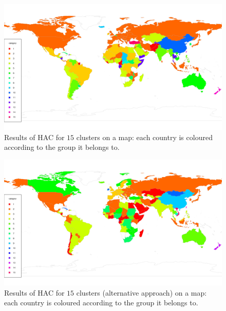 \documentclass[a4paper,12pt]{article}
\numberwithin{equation}{section}
\begin{document}
\newpage 
\FloatBarrier
\begin{figure}[t!]
\begin{minipage}[t]{0.98\textwidth}
\includegraphics[width=\textwidth]{plots/choropleth_15}
\caption{Results of HAC for $15$ clusters on a map: each country is coloured according to the group it belongs to.}
\end{minipage}
\end{figure}

\begin{figure}[t!]
\begin{minipage}[t]{0.98\textwidth}
\includegraphics[width=\textwidth]{plots/choropleth_alt_15}
\caption{Results of HAC for $15$ clusters (alternative approach) on a map: each country is coloured according to the group it belongs to.}
\end{minipage}
\end{figure}
\end{document}
